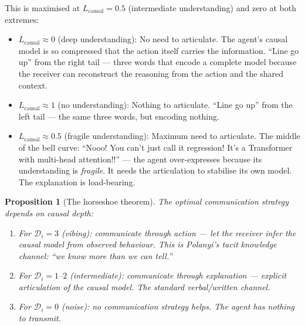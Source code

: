 \documentclass[11pt,a4paper]{article}
\newtheorem{proposition}[theorem]{Proposition}
\begin{document}
This is maximised at $L_{\text{causal}} = 0.5$ (intermediate understanding)
and zero at both extremes:
\begin{itemize}
    \item $L_{\text{causal}} \approx 0$ (deep understanding): No need to
    articulate. The agent's causal model is so compressed that the action
    itself carries the information. ``Line go up'' from the right tail ---
    three words that encode a complete model because the receiver can
    reconstruct the reasoning from the action and the shared context.

    \item $L_{\text{causal}} \approx 1$ (no understanding): Nothing to
    articulate. ``Line go up'' from the left tail --- the same three words,
    but encoding nothing.

    \item $L_{\text{causal}} \approx 0.5$ (fragile understanding): Maximum
    need to articulate. The middle of the bell curve: ``Nooo! You can't
    just call it regression! It's a Transformer with multi-head attention!!''
    --- the agent over-expresses because its understanding is \emph{fragile}.
    It needs the articulation to stabilise its own model. The explanation
    is load-bearing.
\end{itemize}

\begin{proposition}[The horseshoe theorem]\label{prop:horseshoe}
The optimal communication strategy depends on causal depth:
\begin{enumerate}
    \item For $\mathcal{D}_i = 3$ (vibing): communicate through
    \emph{action} --- let the receiver infer the causal model from
    observed behaviour. This is Polanyi's tacit knowledge channel:
    ``we know more than we can tell.''

    \item For $\mathcal{D}_i = 1$--$2$ (intermediate): communicate through
    \emph{explanation} --- explicit articulation of the causal model.
    The standard verbal/written channel.

    \item For $\mathcal{D}_i = 0$ (noise): no communication strategy
    helps. The agent has nothing to transmit.
\end{enumerate}
\end{proposition}
\end{document}
